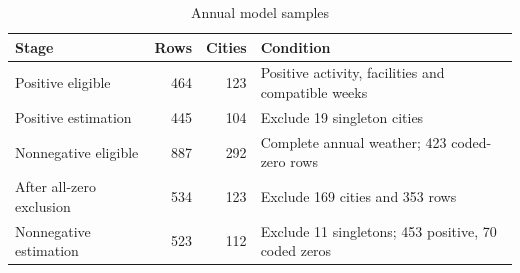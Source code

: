 \begin{table}[htbp]\centering\small
\caption{Annual model samples}\label{tab:sample_models}
\begin{tabular}{@{}p{.27\linewidth}rrp{.47\linewidth}@{}}
\toprule
Stage & Rows & Cities & Condition \\\midrule
Positive eligible & 464 & 123 & Positive activity, facilities and compatible weeks \\
Positive estimation & 445 & 104 & Exclude 19 singleton cities \\
Nonnegative eligible & 887 & 292 & Complete annual weather; 423 coded-zero rows \\
After all-zero exclusion & 534 & 123 & Exclude 169 cities and 353 rows \\
Nonnegative estimation & 523 & 112 & Exclude 11 singletons; 453 positive, 70 coded zeros \\
\bottomrule\end{tabular}
\end{table}
